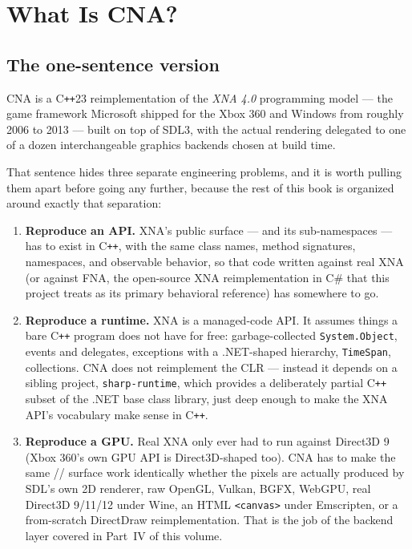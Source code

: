 \chapter{What Is CNA?}
\label{ch:what-is-cna}

\section{The one-sentence version}

CNA is a C\texttt{++}23 reimplementation of the \emph{XNA 4.0} programming model --- the
game framework Microsoft shipped for the Xbox 360 and Windows from roughly 2006 to 2013 ---
built on top of SDL3, with the actual rendering delegated to one of a dozen interchangeable
graphics backends chosen at build time.

That sentence hides three separate engineering problems, and it is worth pulling them
apart before going any further, because the rest of this book is organized around exactly
that separation:

\begin{enumerate}
  \item \textbf{Reproduce an API.} XNA's public surface --- 
        and its sub-namespaces --- has to exist in C\texttt{++}, with the same class names,
        method signatures, namespaces, and observable behavior, so that code written against
        real XNA (or against FNA, the open-source XNA reimplementation in C\# that this
        project treats as its primary behavioral reference) has somewhere to go.
  \item \textbf{Reproduce a runtime.} XNA is a managed-code API. It assumes things a bare
        C\texttt{++} program does not have for free: garbage-collected \texttt{System.Object},
        events and delegates, exceptions with a .NET-shaped hierarchy, \texttt{TimeSpan},
        collections. CNA does not reimplement the CLR --- instead it depends on a sibling
        project, \texttt{sharp-runtime}, which provides a deliberately partial C\texttt{++}
        subset of the .NET base class library, just deep enough to make the XNA API's
        vocabulary make sense in C\texttt{++}.
  \item \textbf{Reproduce a GPU.} Real XNA only ever had to run against Direct3D 9 (Xbox 360's
        own GPU API is Direct3D-shaped too). CNA has to make the same 
        // surface work identically whether the pixels
        are actually produced by SDL's own 2D renderer, raw OpenGL, Vulkan, BGFX, WebGPU, real
        Direct3D 9/11/12 under Wine, an HTML \texttt{<canvas>} under Emscripten, or a
        from-scratch DirectDraw reimplementation. That is the job of the backend layer covered
        in Part~IV of this volume.
\end{enumerate}


